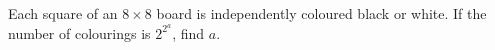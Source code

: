 Each square of an $8\times8$ board is independently coloured black or white. If the number of colourings is $2^{2^a}$, find $a$.
